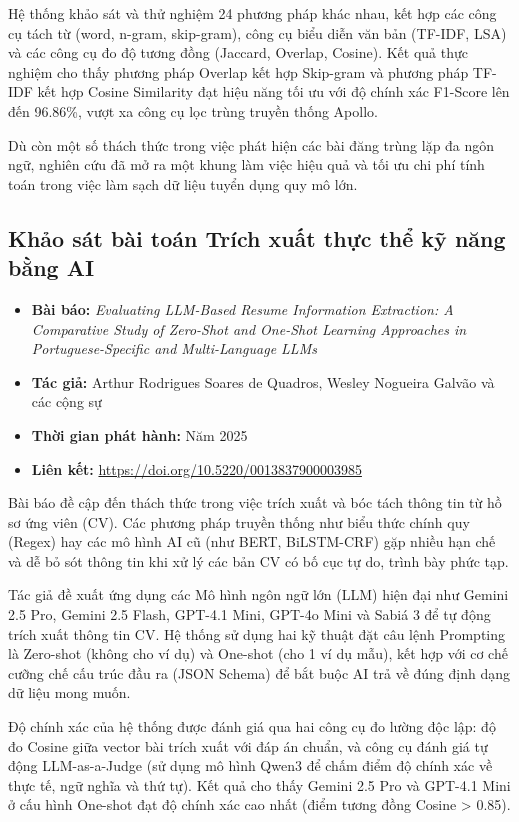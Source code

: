 Hệ thống khảo sát và thử nghiệm 24 phương pháp khác nhau, kết hợp các công cụ tách từ (word, n-gram, skip-gram), công cụ biểu diễn văn bản (TF-IDF, LSA) và các công cụ đo độ tương đồng (Jaccard, Overlap, Cosine). Kết quả thực nghiệm cho thấy phương pháp Overlap kết hợp Skip-gram và phương pháp TF-IDF kết hợp Cosine Similarity đạt hiệu năng tối ưu với độ chính xác F1-Score lên đến 96.86\%, vượt xa công cụ lọc trùng truyền thống Apollo.

Dù còn một số thách thức trong việc phát hiện các bài đăng trùng lặp đa ngôn ngữ, nghiên cứu đã mở ra một khung làm việc hiệu quả và tối ưu chi phí tính toán trong việc làm sạch dữ liệu tuyển dụng quy mô lớn.

\subsection{Khảo sát bài toán Trích xuất thực thể kỹ năng bằng AI}
\begin{itemize}
    \item \textbf{Bài báo:} \textit{Evaluating LLM-Based Resume Information Extraction: A Comparative Study of Zero-Shot and One-Shot Learning Approaches in Portuguese-Specific and Multi-Language LLMs}
    \item \textbf{Tác giả:} Arthur Rodrigues Soares de Quadros, Wesley Nogueira Galvão và các cộng sự
    \item \textbf{Thời gian phát hành:} Năm 2025
    \item \textbf{Liên kết:} \url{https://doi.org/10.5220/0013837900003985}
\end{itemize}

Bài báo đề cập đến thách thức trong việc trích xuất và bóc tách thông tin từ hồ sơ ứng viên (CV). Các phương pháp truyền thống như biểu thức chính quy (Regex) hay các mô hình AI cũ (như BERT, BiLSTM-CRF) gặp nhiều hạn chế và dễ bỏ sót thông tin khi xử lý các bản CV có bố cục tự do, trình bày phức tạp.

Tác giả đề xuất ứng dụng các Mô hình ngôn ngữ lớn (LLM) hiện đại như Gemini 2.5 Pro, Gemini 2.5 Flash, GPT-4.1 Mini, GPT-4o Mini và Sabiá 3 để tự động trích xuất thông tin CV. Hệ thống sử dụng hai kỹ thuật đặt câu lệnh Prompting là Zero-shot (không cho ví dụ) và One-shot (cho 1 ví dụ mẫu), kết hợp với cơ chế cưỡng chế cấu trúc đầu ra (JSON Schema) để bắt buộc AI trả về đúng định dạng dữ liệu mong muốn.

Độ chính xác của hệ thống được đánh giá qua hai công cụ đo lường độc lập: độ đo Cosine giữa vector bài trích xuất với đáp án chuẩn, và công cụ đánh giá tự động LLM-as-a-Judge (sử dụng mô hình Qwen3 để chấm điểm độ chính xác về thực tế, ngữ nghĩa và thứ tự). Kết quả cho thấy Gemini 2.5 Pro và GPT-4.1 Mini ở cấu hình One-shot đạt độ chính xác cao nhất (điểm tương đồng Cosine > 0.85).

